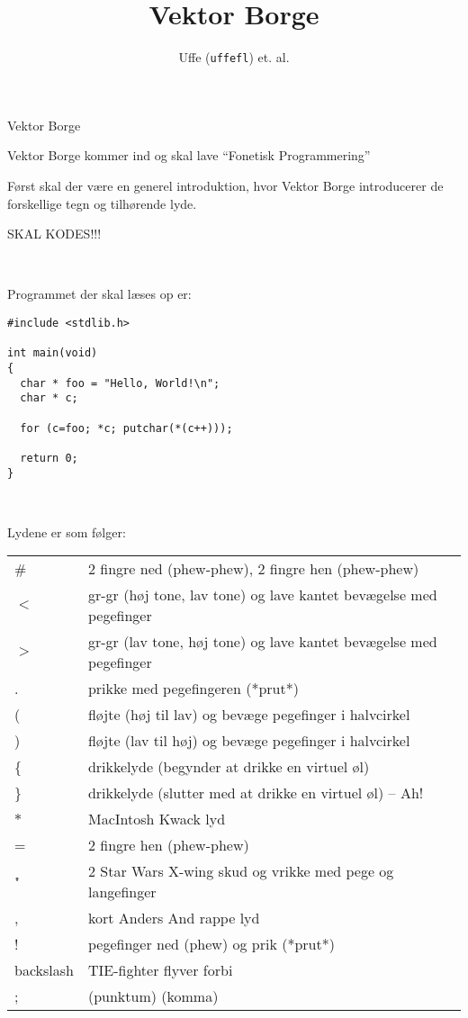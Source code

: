 \documentclass[danish]{article}
\title{Vektor Borge}
\author{Uffe (\texttt{uffefl}) et. al.}
\begin{document}
\maketitle

\begin{roles}
   Vektor Borge
\end{roles}

\begin{sketch}

\scene Vektor Borge kommer ind og skal lave ``Fonetisk Programmering''

Først skal der være en generel introduktion, hvor Vektor Borge introducerer de
forskellige tegn og tilhørende lyde.

SKAL KODES!!!

~

\noindent
Programmet der skal læses op er:

\begin{verbatim}
#include <stdlib.h>

int main(void)
{
  char * foo = "Hello, World!\n";
  char * c;

  for (c=foo; *c; putchar(*(c++)));

  return 0;
}
\end{verbatim}

~

\noindent
Lydene er som følger:

\begin{tabular}{ll}
\# & 2 fingre ned (phew-phew), 2 fingre hen (phew-phew) \\
$<$ & gr-gr (høj tone, lav tone) og lave kantet bevægelse med pegefinger\\
$>$ & gr-gr (lav tone, høj tone) og lave kantet bevægelse med pegefinger\\
. & prikke med pegefingeren (*prut*) \\
( & fløjte (høj til lav) og bevæge pegefinger i halvcirkel\\
) & fløjte (lav til høj) og bevæge pegefinger i halvcirkel\\
\{ & drikkelyde (begynder at drikke en virtuel øl) \\
\} & drikkelyde (slutter med at drikke en virtuel øl) -- Ah! \\
$*$ & MacIntosh Kwack lyd \\
= & 2 fingre hen (phew-phew) \\
" & 2 Star Wars X-wing skud og vrikke med pege og langefinger \\
, & kort Anders And rappe lyd \\
! & pegefinger ned (phew) og prik (*prut*) \\
backslash & TIE-fighter flyver forbi \\
; & (punktum) (komma) \\
\end{tabular}

\end{sketch}
\end{document}
